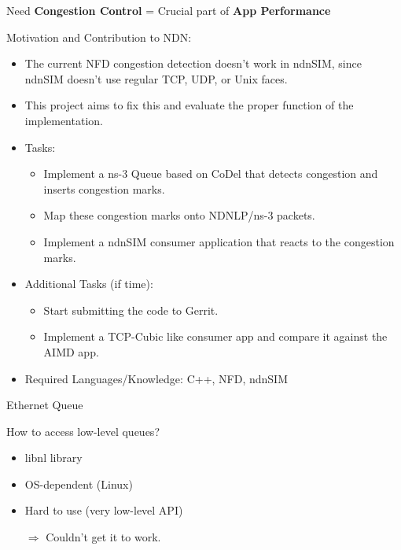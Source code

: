 

\begin{frame}{Need}
\textbf{Congestion Control} = Crucial part of \textbf{App Performance}
\end{frame}


\begin{frame}{Motivation and Contribution to NDN:}
\begin{itemize}
\item The current NFD congestion detection doesn't work in ndnSIM, since ndnSIM doesn't use regular TCP, UDP, or Unix faces. 
\item This project aims to fix this and evaluate the proper function of the implementation.
\item Tasks: 
\begin{itemize}
\item Implement a ns-3 Queue based on CoDel that detects congestion and inserts congestion marks.
\item Map these congestion marks onto NDNLP/ns-3 packets.
\item Implement a ndnSIM consumer application that reacts to the congestion marks.
\end{itemize}
\item Additional Tasks (if time):
\begin{itemize}
\item Start submitting the code to Gerrit.
\item Implement a TCP-Cubic like consumer app and compare it against the AIMD app.
\end{itemize}
\item Required Languages/Knowledge: C++, NFD, ndnSIM
\end{itemize}


\end{frame}



\begin{frame}{Ethernet Queue}

How to access low-level queues?
\begin{itemize}
\item libnl library
\item OS-dependent (Linux)
\item Hard to use (very low-level API)
\item[$\Rightarrow$] Couldn't get it to work.
\end{itemize}

\end{frame}


